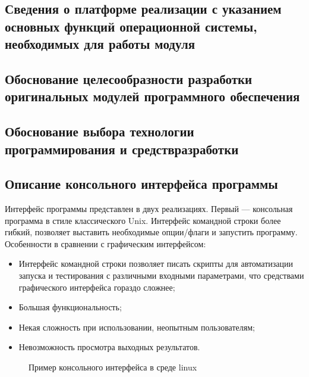\subsection{Сведения о платформе реализации с указанием основных функций операционной системы, необходимых для работы модуля}
\subsection{Обоснование целесообразности разработки оригинальных модулей программного обеспечения}
\subsection{Обоснование выбора технологии программирования и средствразработки}
\subsection{Описание консольного интерфейса программы}%
Интерфейс программы представлен в двух реализациях.
Первый — консольная программа в стиле классического Unix. Интерфейс командной строки более гибкий, позволяет выставить необходимые опции/флаги и запустить программу. Особенности в сравнении с графическим интерфейсом:
\begin{itemize}
\item Интерфейс командной строки позволяет писать скрипты для автоматизации запуска и тестирования с различными входными параметрами, что средствами графического интерфейса гораздо сложнее;
\item Большая функциональность;
\item Некая сложность при использовании, неопытным пользователям;
\item Невозможность просмотра выходных результатов.
\end{itemize}

\begin{figure}[ht]
\caption{Пример консольного интерфейса в среде linux}
\label{pic:con_scr}
\end{figure}

